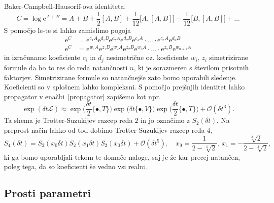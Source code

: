 \documentclass[12pt, a4paper]{article}
\renewcommand{\L}{
    \ensuremath{\mathcal{L}}
}
\newcommand{\e}{
    \ensuremath{\mathrm{e}}
}
\newcommand{\sfrac}[2]{
    \ensuremath{\textstyle{\frac{#1}{#2}}}
}
\begin{document}
Baker-Campbell-Hausorff-ova identiteta:
\[
    C = \log{\e^{A + B}} = A + B + \sfrac{1}{2}[A,B] + \sfrac{1}{12}\big[A,[A,B]\big] -
        \sfrac{1}{12}\big[B,[A,B]\big] +\ldots
\]
S pomo\v cjo le-te si lahko zamislimo pogoja
\begin{align}
    \e^C &= \e^{c_1 A}\e^{d_1 B}\e^{c_2 A}\e^{d_2 B}\e^{c_3 A}\cdot \ldots \cdot \e^{c_n A}\e^{d_n B} \\
    \e^C &= \e^{w_1 A}\e^{z_1 B}\e^{w_2 A}\e^{z_2 B}\e^{w_3 A}\cdot \ldots \cdot \e^{z_n B}\e^{w_{n+1} A}
\end{align}
in izra\v cunamo koeficiente $c_i$ in $d_j$ nesimetri\v cne oz. koeficiente $w_i$, $z_i$ simetrizirane
formule da bo to res do reda natan\v cnosti $n$, ki je sorazmeren s \v stevilom prisotnih faktorjev.
Simetrizirane formule so natan\v cnej\v se zato bomo uporabili sledenje. Koeficienti so v splo\v snem
lahko kompleksni. S pomo\v cjo prej\v snjih identitet lahko propagator v ena\v cbi~\eqref{propagator}
zapi\v semo kot npr.
\[
    \exp(\delta t\L) \approx \exp\big(\sfrac{\delta t}{2}\{\bullet, T\}\big)
    \exp\big(\delta t\{\bullet, V\}\big)
    \exp\big(\sfrac{\delta t}{2}\{\bullet, T\}\big) + \mathcal{O}(\delta t^3).
\]
Ta shema je Trotter-Suzukijev razcep reda $2$ in jo ozna\v cimo z $S_2(\delta t)$. Na preprost na\v cin
lahko od tod dobimo Trotter-Suzukijev razcep reda $4$,
\[
    S_4 (\delta t) = S_2(x_0 \delta t) S_2(x_1 \delta t) S_2(x_0 \delta t) + \mathcal{O}(\delta t^5), \quad
    x_0 = \frac{1}{2 - \sqrt[3]{2}},\ x_1 = -\frac{\sqrt[3]{2}}{2 - \sqrt[3]{2}},
\]
ki ga bomo uporabljali tekom te doma\v ce naloge, saj je \v ze kar precej natan\v cen, poleg tega, da so
koeficienti \v se vedno vsi realni.

\subsection{Prosti parametri}
\end{document}
